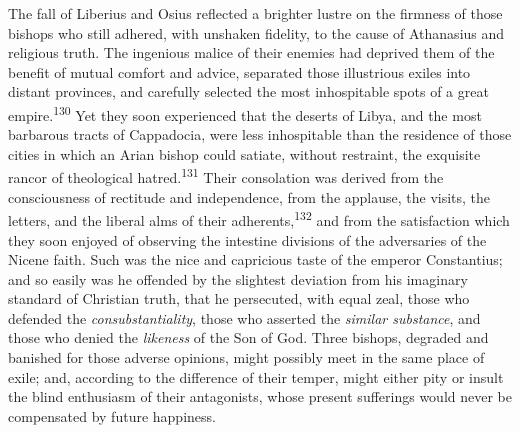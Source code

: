 

The fall of Liberius and Osius reflected a brighter lustre on the
firmness of those bishops who still adhered, with unshaken
fidelity, to the cause of Athanasius and religious truth. The
ingenious malice of their enemies had deprived them of the
benefit of mutual comfort and advice, separated those illustrious
exiles into distant provinces, and carefully selected the most
inhospitable spots of a great empire.\textsuperscript{130} Yet they soon
experienced that the deserts of Libya, and the most barbarous
tracts of Cappadocia, were less inhospitable than the residence
of those cities in which an Arian bishop could satiate, without
restraint, the exquisite rancor of theological hatred.\textsuperscript{131} Their
consolation was derived from the consciousness of rectitude and
independence, from the applause, the visits, the letters, and the
liberal alms of their adherents,\textsuperscript{132} and from the satisfaction
which they soon enjoyed of observing the intestine divisions of
the adversaries of the Nicene faith. Such was the nice and
capricious taste of the emperor Constantius; and so easily was he
offended by the slightest deviation from his imaginary standard
of Christian truth, that he persecuted, with equal zeal, those
who defended the \textit{consubstantiality}, those who asserted the
\textit{similar substance}, and those who denied the \textit{likeness} of the
Son of God. Three bishops, degraded and banished for those
adverse opinions, might possibly meet in the same place of exile;
and, according to the difference of their temper, might either
pity or insult the blind enthusiasm of their antagonists, whose
present sufferings would never be compensated by future
happiness.


